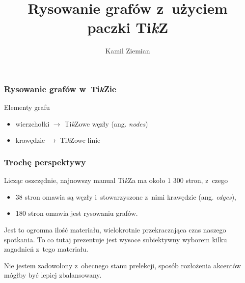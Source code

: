 \documentclass[10pt,t]{beamer}
\title{Rysowanie grafów z~użyciem paczki Ti\textit{k}Z}
\author{Kamil Ziemian}
\date{}
\begin{document}






\RaggedRight





\maketitle










\begin{frame}
  \frametitle{Rysowanie grafów w~Ti\textit{k}Zie}


  Elementy grafu
  \begin{itemize}
    \RaggedRight

  \item wierzchołki $\to$ Ti\textit{k}Zowe węzły (ang. \textit{nodes})

  \item krawędzie $\to$ Ti\textit{k}Zowe linie

  \end{itemize}

\end{frame}




\begin{frame}
  \frametitle{Trochę perspektywy}


  Licząc oszczędnie, najnowszy manual Ti\textit{k}Za ma około 1 300
  stron, z~czego
  \begin{itemize}
    \RaggedRight

  \item 38 stron omawia są węzły i~stowarzyszone z~nimi krawędzie
    (ang. \textit{edges}),

  \item 180 stron omawia jest rysowaniu grafów.

  \end{itemize}

  Jest to ogromna ilość materiału, wielokrotnie przekraczająca czas
  naszego spotkania. To co tutaj prezentuje jest wysoce subiektywny
  wyborem kilku zagadnień z~tego materiału.

  Nie jestem zadowolony z~obecnego stanu prelekcji, sposób rozłożenia
  akcentów mógłby być lepiej zbalansowany.

\end{frame}
\end{document}
